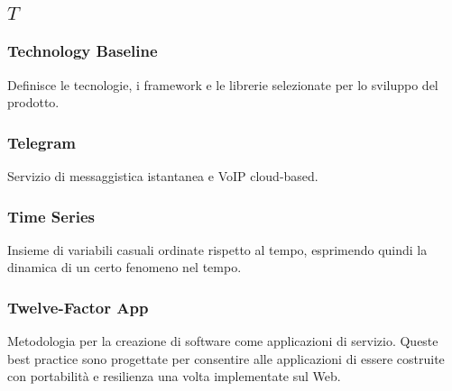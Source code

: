 \subsection*{\quad$T\quad$}
\subsubsection*{Technology Baseline}
Definisce le tecnologie, i framework e le librerie selezionate per lo sviluppo del prodotto.

\subsubsection*{Telegram}
Servizio di messaggistica istantanea  e VoIP cloud-based.


\subsubsection*{Time Series}
Insieme di variabili casuali ordinate rispetto al tempo, esprimendo quindi la dinamica di un certo fenomeno nel tempo.


\subsubsection*{Twelve-Factor App}
Metodologia per la creazione di software come applicazioni di servizio. Queste best practice sono progettate per consentire alle applicazioni di essere costruite con portabilità e resilienza una volta implementate sul Web.

